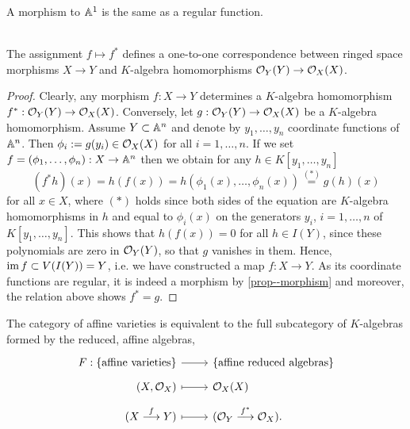 \documentclass[a4paper,11pt]{article}
\begin{document}
			\begin{cor}
				A morphism to $\AA^1$ is the same as a regular function.
			\end{cor}

			\begin{thm}
				\phantom{k}\\ The assignment $f\mapsto f^\ast$ defines a one-to-one correspondence between ringed space morphisms $X\rightarrow Y$ and $K$-algebra homomorphisms $\O_Y(Y)\rightarrow\O_X(X)$.
			\end{thm}
			\begin{proof}
				Clearly, any morphism $f:X\rightarrow Y$ determines a $K$-algebra homomorphism $f^\ast:\O_Y(Y)\rightarrow\O_X(X)$. Conversely, let $g:\O_Y(Y)\rightarrow\O_X(X)$ be a $K$-algebra homomorphism. Assume $Y\subset\AA^n$ and denote by $y_1,\dots,y_n$ coordinate functions of $\AA^n$. Then $\phi_i:=g(y_i)\in\O_X(X)$ for all $i=1,\dots,n$. If we set $f=(\phi_1,\dots,\phi_n):X\rightarrow\AA^n$ then we obtain for any $h\in K[y_1,\dots,y_n]$
				\begin{equation*}
					(f^\ast h)(x)=h(f(x))=h(\phi_1(x),\dots,\phi_n(x))\overset{(\ast)}{=}g(h)(x)
				\end{equation*}
				for all $x\in X$, where $(\ast)$ holds since both sides of the equation are $K$-algebra homomorphisms in $h$ and equal to $\phi_i(x)$ on the generators $y_i$, $i=1,\dots,n$ of $K[y_1,\dots,y_n]$. This shows that $h(f(x))=0$ for all $h\in I(Y)$, since these polynomials are zero in $\O_Y(Y)$, so that $g$ vanishes in them. Hence, $\im f\subset V(I(Y))=Y$, i.e. we have constructed a map $f:X\rightarrow Y$. As its coordinate functions are regular, it is indeed a morphism by \autoref{prop--morphism} and moreover, the relation above shows $f^\ast=g$.
			\end{proof}

			\begin{cor}\label{cor--category-equivalence}
				The category of affine varieties is equivalent to the full subcategory of $K$-algebras formed by the reduced, affine algebras,
				\begin{equation*}
					\begin{tikzcd}[row sep=tiny,
						/tikz/column 1/.append style={nodes={anchor=base east}},
						/tikz/column 2/.append style={nodes={anchor=base west}}]
						F:\{\text{affine varieties}\}\ar[r,] & \{\text{affine reduced algebras}\}\\
						(X,\O_X)\ar[r,mapsto] & \O_X(X)\\
						(X\overset{f}{\longrightarrow}Y)\ar[r,mapsto] & (\O_Y\overset{f^\ast}{\longrightarrow}\O_X).
					\end{tikzcd}
				\end{equation*} 
			\end{cor}
\end{document}

